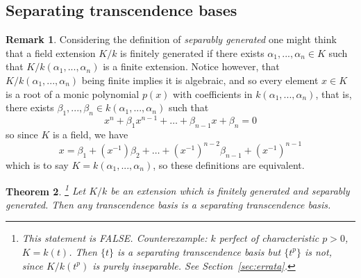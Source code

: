 \documentclass[12pt]{article}
\theoremstyle{plain}
\newtheorem{thm}{Theorem}[subsection] %
\theoremstyle{definition}
\newtheorem{remark}[thm]{Remark}
\begin{document}
\subsection{Separating transcendence bases}
\begin{remark}
Considering the definition of \emph{separably generated} one might think that a field extension $K/k$ is finitely generated if there exists $\alpha_1,...,\alpha_n \in K$ such that $K/k(\alpha_1,...,\alpha_n)$ is a finite extension. Notice however, that $K/k(\alpha_1,...,\alpha_n)$ being finite implies it is algebraic, and so every element $x \in K$ is a root of a monic polynomial $p(x)$ with coefficients in $k(\alpha_1,...,\alpha_n)$, that is, there exists $\beta_1,...,\beta_n \in k(\alpha_1,...,\alpha_n)$ such that
\[x^n + \beta_1 x^{n-1} + \hdots + \beta_{n-1}x + \beta_n = 0\]
so since $K$ is a field, we have
\[x = \beta_1 + (x^{-1})\beta_2 + \hdots + (x^{-1})^{n-2}\beta_{n-1} + (x^{-1})^{n-1}\]
which is to say $K = k(\alpha_1,...,\alpha_n)$, so these definitions are equivalent.
\end{remark}
\begin{thm}
\label{thm:sep_transc_subset}\footnote{This statement is FALSE. Counterexample: $k$ perfect of characteristic $p>0$, $K=k(t)$. Then $\{t\}$ is a separating transcendence basis but $\{t^p\}$ is not, since $K/k(t^p)$ is purely inseparable. See Section~\ref{sec:errata}.}
Let $K/k$ be an extension which is finitely generated and separably generated. Then any transcendence basis is a separating transcendence basis.
\end{thm}
\end{document}
